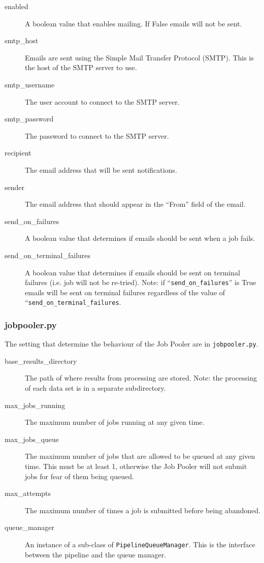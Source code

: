 \begin{description}
    \item[enabled] A boolean value that enables mailing. If False emails will not be sent.
    \item[smtp\_host] Emails are sent using the Simple Mail Transfer Protocol (SMTP). This is the host of the SMTP server to use.
    \item[smtp\_username] The user account to connect to the SMTP server.
    \item[smtp\_password] The password to connect to the SMTP server.
    \item[recipient] The email address that will be sent notifications.
    \item[sender] The email address that should appear in the ``From'' field of the email.
    \item[send\_on\_failures] A boolean value that determines if emails should be sent when a job fails.
    \item[send\_on\_terminal\_failures] A boolean value that determines if emails should be sent on terminal failures (i.e. job will not be re-tried). Note: if ``\texttt{send\_on\_failures}'' is True emails will be sent on terminal failures regardless of the value of ``\texttt{send\_on\_terminal\_failures}.
\end{description}


\subsubsection{jobpooler.py}
The setting that determine the behaviour of the Job Pooler are in \texttt{jobpooler.py}.

\begin{description}
    \item[base\_results\_directory] The path of where results from processing are stored. Note: the processing of each data set is in a separate subdirectory.
    \item[max\_jobs\_running] The maximum number of jobs running at any given time.
    \item[max\_jobs\_queue] The maximum number of jobs that are allowed to be queued at any given time. This must be at least 1, otherwise the Job Pooler will not submit jobs for fear of them being queued.
    \item[max\_attempts] The maximum number of times a job is submitted before being abandoned.
    \item[queue\_manager] An instance of a sub-class of \texttt{PipelineQueueManager}. This is the interface between the pipeline and the queue manager.
\end{description}

